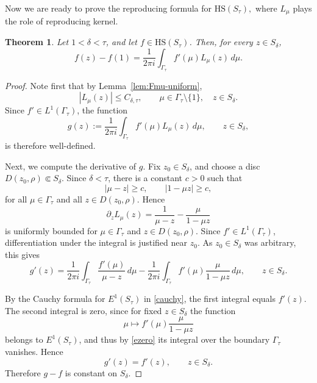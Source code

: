 \documentclass[11pt]{amsart}
\numberwithin{equation}{section}
\newtheorem{theorem}{Theorem}[section]
\theoremstyle{definition}
\theoremstyle{plain}
\newcommand{\HS}{\mathrm{HS}}
\begin{document}
Now we are ready to prove the reproducing formula for $\HS(S_\tau),$
where $L_\mu$ plays the role of reproducing kernel.
\begin{theorem}\label{thm:scalar-reproducing}
Let \(1<\delta<\tau\), and let \(f\in\HS(S_\tau)\).  Then, for every
\(z\in S_\delta\),
\begin{equation}\label{eq:scalar-reproducing}
        f(z)-f(1)
        =
        \frac{1}{2\pi i}
        \int_{\Gamma_\tau}f'(\mu)L_\mu(z)\,d\mu.
\end{equation}
\end{theorem}
\begin{proof}
Note first that by Lemma~\ref{lem:Fmu-uniform},
\[
    |L_\mu(z)|
    \le C_{\delta,\tau},
    \qquad
    \mu\in\Gamma_\tau\setminus\{1\},
    \quad z\in S_\delta.
\]
Since $f'\in L^1(\Gamma_\tau)$, the function
\[
    g(z)
    :=
    \frac{1}{2\pi i}
    \int_{\Gamma_\tau}f'(\mu)L_\mu(z)\,d\mu,
    \qquad z\in S_\delta,
\]
is therefore well-defined.


Next, we compute the derivative of \(g\).  
Fix \(z_0\in S_\delta\), and choose a disc
\(D(z_0,\rho)\Subset S_\delta\).
Since \(\delta<\tau\),
there is a constant \(c>0\) such that
\[
        |\mu-z|\ge c,\qquad |1-\mu z|\ge c,
\]
for all \(\mu\in\Gamma_\tau\) and all \(z\in D(z_0,\rho)\). Hence
\[
        \partial_z L_\mu(z)
        =
        \frac{1}{\mu-z}-\frac{\mu}{1-\mu z}
\]
is uniformly bounded for \(\mu\in\Gamma_\tau\) and \(z\in D(z_0,\rho)\).
Since \(f'\in L^1(\Gamma_\tau)\), differentiation under the integral is
justified near \(z_0\). As \(z_0\in S_\delta\) was arbitrary, this gives
\[
        g'(z)
        =
        \frac{1}{2\pi i}
        \int_{\Gamma_\tau}\frac{f'(\mu)}{\mu-z}\,d\mu
        -
        \frac{1}{2\pi i}
        \int_{\Gamma_\tau}f'(\mu)\frac{\mu}{1-\mu z}\,d\mu ,
        \qquad z\in S_\delta.
\]

By the Cauchy formula for
\(E^1(S_\tau)\) in \eqref{cauchy}, the first integral equals \(f'(z)\).  The second integral is zero, since for fixed
\(z\in S_\delta\) the function
\[
        \mu\mapsto f'(\mu)\frac{\mu}{1-\mu z}
\]
belongs to \(E^1(S_\tau)\), and thus by \eqref{ezero} its integral over the boundary
 \(\Gamma_\tau\)
vanishes. Hence
\[
        g'(z)=f'(z),\qquad z\in S_\delta .
\]
Therefore $g-f$
is constant on \(S_\delta\).


\end{proof}
\end{document}

